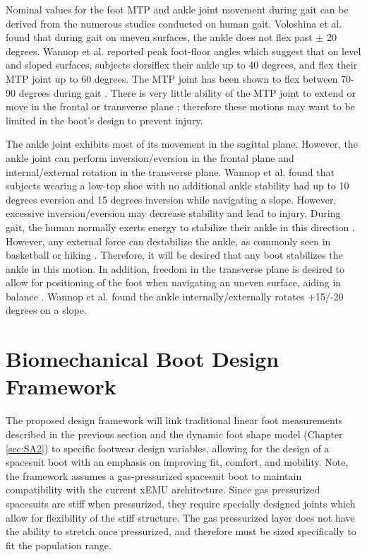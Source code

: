 \documentclass[defaultstyle,11pt]{thesis}
\begin{document}
Nominal values for the foot MTP and ankle joint movement during gait can be derived from the numerous studies conducted on human gait.
Voloshina et al. \citep{Voloshina2013} found that during gait on uneven surfaces, the ankle does not flex past \(\pm\) 20 degrees.
Wannop et al. \citep{Wannop2014} reported peak foot-floor angles which suggest that on level and sloped surfaces, subjects dorsiflex their ankle up to 40 degrees, and flex their MTP joint up to 60 degrees.
The MTP joint has been shown to flex between 70-90 degrees during gait \citep{Mann1979}.
There is very little ability of the MTP joint to extend or move in the frontal or transverse plane \citep{Mann1979}; therefore these motions may want to be limited in the boot's design to prevent injury.

The ankle joint exhibits most of its movement in the sagittal plane.
However, the ankle joint can perform inversion/eversion in the frontal plane and internal/external rotation in the transverse plane.
Wannop et al. \citep{Wannop2014} found that subjects wearing a low-top shoe with no additional ankle stability had up to 10 degrees eversion and 15 degrees inversion while navigating a slope.
However, excessive inversion/eversion may decrease stability and lead to injury.
During gait, the human normally exerts energy to stabilize their ankle in this direction \citep{OLoughlin2009}.
However, any external force can destabilize the ankle, as commonly seen in basketball or hiking \citep{Bohm2010}.
Therefore, it will be desired that any boot stabilizes the ankle in this motion.
In addition, freedom in the transverse plane is desired to allow for positioning of the foot when navigating an uneven surface, aiding in balance \citep{Wannop2014, Fraser2016a}.
Wannop et al. \citep{Wannop2014} found the ankle internally/externally rotates +15/-20 degrees on a slope.

\hypertarget{biomechanical-boot-design-framework}{%
\section{Biomechanical Boot Design Framework}\label{biomechanical-boot-design-framework}}

The proposed design framework will link traditional linear foot measurements described in the previous section and the dynamic foot shape model (Chapter \ref{sec:SA2}) to specific footwear design variables, allowing for the design of a spacesuit boot with an emphasis on improving fit, comfort, and mobility.
Note, the framework assumes a gas-pressurized spacesuit boot to maintain compatibility with the current xEMU architecture.
Since gas pressurized spacesuits are stiff when pressurized, they require specially designed joints which allow for flexibility of the stiff structure.
The gas pressurized layer does not have the ability to stretch once pressurized, and therefore must be sized specifically to fit the population range.
\end{document}
